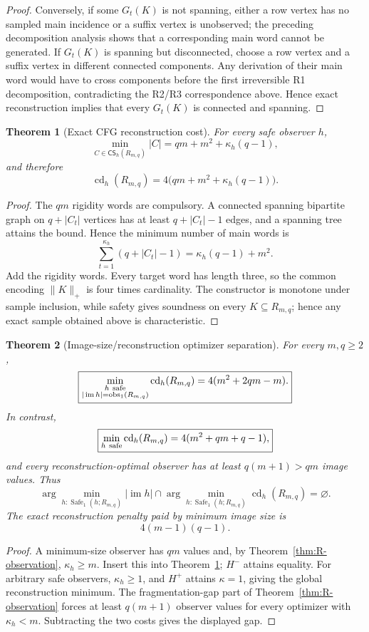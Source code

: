 \documentclass[11pt]{article}
\newtheorem{theorem}{Theorem}[section]
\theoremstyle{definition}
\theoremstyle{remark}
\newcommand{\im}{\operatorname{im}}
\newcommand{\obs}{\operatorname{obs}}
\newcommand{\cd}{\operatorname{cd}}
\newcommand{\CS}{\mathsf{CS}}
\newcommand{\Safe}{\operatorname{Safe}}
\begin{document}
\begin{proof}
Conversely, if some \(G_t(K)\) is not spanning, either a row vertex has no
sampled main incidence or a suffix vertex is unobserved; the preceding
decomposition analysis shows that a corresponding main word cannot be
generated.  If \(G_t(K)\) is spanning but disconnected, choose a row vertex
and a suffix vertex in different connected components.  Any derivation of
their main word would have to cross components before the first irreversible
R1 decomposition, contradicting the R2/R3 correspondence above.  Hence exact
reconstruction implies that every \(G_t(K)\) is connected and spanning.
\end{proof}

\begin{theorem}[Exact CFG reconstruction cost]
\label{thm:R-cost}
For every safe observer \(h\),
\[
 \min_{C\in\CS_h(R_{m,q})}|C|
 =
 qm+m^2+\kappa_h(q-1),
\]
and therefore
\[
 \boxed{
 \cd_h(R_{m,q})
 =
 4\bigl(qm+m^2+\kappa_h(q-1)\bigr).
 }
\]
\end{theorem}

\begin{proof}
The \(qm\) rigidity words are compulsory.  A connected spanning bipartite
graph on \(q+|C_t|\) vertices has at least
\(q+|C_t|-1\) edges, and a spanning tree attains the bound.  Hence the
minimum number of main words is
\[
 \sum_{t=1}^{\kappa_h}(q+|C_t|-1)
 =
 \kappa_h(q-1)+m^2.
\]
Add the rigidity words.  Every target word has length three, so the common
encoding \(\|K\|_+\) is four times cardinality.  The constructor is monotone
under sample inclusion, while safety gives soundness on every
\(K\subseteq R_{m,q}\); hence any exact sample obtained above is characteristic.
\end{proof}

\begin{theorem}[Image-size/reconstruction optimizer separation]
\label{thm:R-separation}
For every \(m,q\ge2\),
\[
 \boxed{
 \min_{\substack{h\ {\rm safe}\\|\im h|=\obs_1(R_{m,q})}}
 \cd_h(R_{m,q})
 =
 4(m^2+2qm-m).
 }
\]
In contrast,
\[
 \boxed{
 \min_{h\ {\rm safe}}\cd_h(R_{m,q})
 =
 4(m^2+qm+q-1),
 }
\]
and every reconstruction-optimal observer has at least \(q(m+1)>qm\)
image values.  Thus
\[
 \boxed{
 \arg\min_{h:\Safe_1(h;R_{m,q})}|\im h|
 \cap
 \arg\min_{h:\Safe_1(h;R_{m,q})}\cd_h(R_{m,q})
 =\varnothing.
 }
\]
The exact reconstruction penalty paid by minimum image size is
\[
 \boxed{4(m-1)(q-1).}
\]
\end{theorem}

\begin{proof}
A minimum-size observer has \(qm\) values and, by
Theorem~\ref{thm:R-observation}, \(\kappa_h\ge m\).  Insert this into
Theorem~\ref{thm:R-cost}; \(H^-\) attains equality.  For arbitrary safe
observers, \(\kappa_h\ge1\), and \(H^+\) attains \(\kappa=1\), giving the
global reconstruction minimum.  The fragmentation-gap part of
Theorem~\ref{thm:R-observation} forces at least \(q(m+1)\) observer values
for every optimizer with \(\kappa_h<m\).  Subtracting the two costs gives the
displayed gap.
\end{proof}
\end{document}
